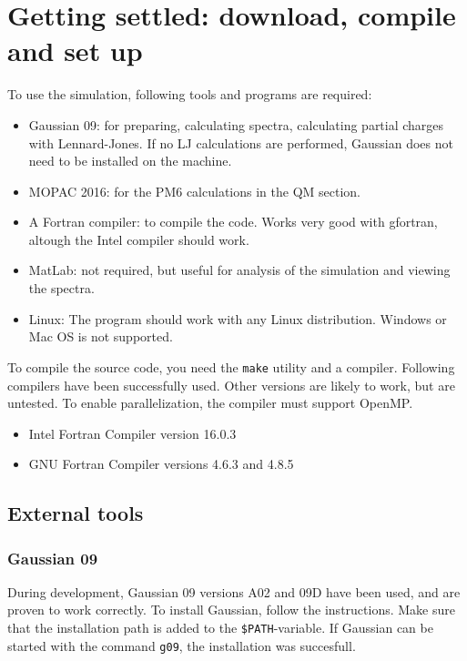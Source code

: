 	\chapter{Getting settled: download, compile and set up}
	To use the simulation, following tools and programs are required:
	\begin{itemize}
		\item Gaussian 09: for preparing, calculating spectra, calculating 
		partial 
		charges with Lennard-Jones. If no LJ calculations are performed, 
		Gaussian 
		does not need to be installed on the machine.
		\item MOPAC 2016: for the PM6 calculations in the QM section.
		\item A Fortran compiler: to compile the code. Works very good with 
		gfortran, altough the Intel compiler should work.
		\item MatLab: not required, but useful for analysis of the simulation 
		and 
		viewing the spectra.
		\item Linux: The program should work with any Linux distribution. 
		Windows 
		or Mac OS is not supported.
	\end{itemize}
	
	To compile the source code, you need the \verb|make| utility and a 
	compiler. 
	Following compilers have been successfully used. Other versions are likely 
	to 
	work, but are untested. To enable parallelization, the compiler must 
	support 
	OpenMP.
	\begin{itemize}
		\item Intel Fortran Compiler version 16.0.3
		\item GNU Fortran Compiler versions 4.6.3 and 4.8.5
	\end{itemize}
	
	\section{External tools}
	\subsection{Gaussian 09}
	During development, Gaussian 09\cite{g09} versions A02 and 09D have been 
	used, 
	and are proven to work correctly.
	To install Gaussian, follow the instructions. Make sure that the 
	installation 
	path is added to the \verb|$PATH|-variable. If Gaussian can be started with 
	the 
	command \verb|g09|, the installation was succesfull.
	
